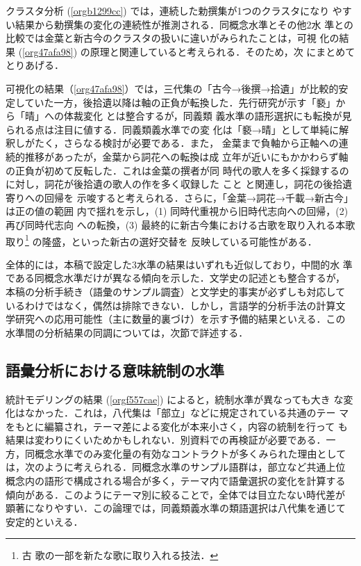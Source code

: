 \documentclass[submit]{ipsj}
\renewcommand{\ref}{\cref}
\begin{document}
クラスタ分析 (\ref{orgb1299cc}) では，連続した勅撰集が1つのクラスタになり
やすい結果から勅撰集の変化の連続性が推測される．同概念水準とその他2水
準との比較では金葉と新古今のクラスタの扱いに違いがみられたことは，可視
化の結果 (\ref{org47afa98}) の原理と関連していると考えられる．そのため，次
にまとめてとりあげる．

可視化の結果（\ref{org47afa98}）では，三代集の「古今→後撰→拾遺」が比較的安
定していた一方，後拾遺以降は軸の正負が転換した．先行研究が示す「褻」か
ら「晴」への体裁変化 \cite{ueno1976Koshui} とは整合するが，同義類
義水準の語形選択にも転換が見られる点は注目に値する．同義類義水準での変
化は「褻→晴」として単純に解釈しがたく，さらなる検討が必要である．また，
金葉まで負軸から正軸への連続的推移があったが，金葉から詞花への転換は成
立年が近いにもかかわらず軸の正負が初めて反転した．これは金葉の撰者が同
時代の歌人を多く採録するのに対し，詞花が後拾遺の歌人の作を多く収録した
こと \cite{matsuda1939Shika} と関連し，詞花の後拾遺寄りへの回帰を
示唆すると考えられる．さらに，「金葉→詞花→千載→新古今」は正の値の範囲
内で揺れを示し，(1) 同時代重視から旧時代志向への回帰，(2) 再び同時代志向
への転換，(3) 最終的に新古今集における古歌を取り入れる本歌取り\footnote{古
歌の一部を新たな歌に取り入れる技法．} の隆盛，といった新古の選好交替を
反映している可能性がある．

全体的には，本稿で設定した3水準の結果はいずれも近似しており，中間的水
準である同概念水準だけが異なる傾向を示した．文学史の記述とも整合するが，
本稿の分析手続き（語彙のサンプル調査）と文学史的事実が必ずしも対応して
いるわけではなく，偶然は排除できない．しかし，言語学的分析手法の計算文
学研究への応用可能性（主に数量的裏づけ）を示す予備的結果といえる．この
水準間の分析結果の同調については，次節で詳述する．
\subsection{語彙分析における意味統制の水準\label{orga4431da}}
\label{sec:orgdcd2a72}
統計モデリングの結果 (\ref{orgf557cae}) によると，統制水準が異なっても大き
な変化はなかった．これは，八代集は「部立」などに規定されている共通のテー
マをもとに編纂され，テーマ差による変化が本来小さく，内容の統制を行って
も結果は変わりにくいためかもしれない．別資料での再検証が必要である．一
方，同概念水準でのみ変化量の有効なコントラクトが多くみられた理由として
は，次のように考えられる．同概念水準のサンプル語群は，部立など共通上位
概念内の語形で構成される場合が多く，テーマ内で語彙選択の変化を計算する
傾向がある．このようにテーマ別に絞ることで，全体では目立たない時代差が
顕著になりやすい．この論理では，同義類義水準の類語選択は八代集を通じて
安定的といえる．
\end{document}
